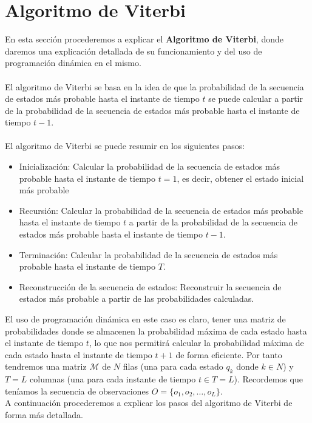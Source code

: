 \documentclass[11pt,openany]{book}
\begin{document}
\section{Algoritmo de Viterbi}
En esta sección procederemos a explicar el \textbf{Algoritmo de Viterbi}, donde daremos una explicación detallada de su funcionamiento y del uso de programación dinámica en el mismo. \\ \\
El algoritmo de Viterbi se basa en la idea de que la probabilidad de la secuencia de estados más probable hasta el instante de tiempo $t$ se puede calcular a partir de la probabilidad
de la secuencia de estados más probable hasta el instante de tiempo $t-1$. \\ \\
El algoritmo de Viterbi se puede resumir en los siguientes pasos:
\begin{itemize}
      \item Inicialización: Calcular la probabilidad de la secuencia de estados más probable hasta el instante de tiempo $t=1$, es decir, obtener el estado inicial más probable 
      \item Recursión: Calcular la probabilidad de la secuencia de estados más probable hasta el instante de tiempo $t$ a partir de la probabilidad de la secuencia de estados más probable
      hasta el instante de tiempo $t-1$.
      \item Terminación: Calcular la probabilidad de la secuencia de estados más probable hasta el instante de tiempo $T$.
      \item Reconstrucción de la secuencia de estados: Reconstruir la secuencia de estados más probable a partir de las probabilidades calculadas.
\end{itemize}

El uso de programación dinámica en este caso es claro, tener una matriz de probabilidades donde se almacenen la probabilidad máxima de cada estado hasta el instante de tiempo $t$,
lo que nos permitirá calcular la probabilidad máxima de cada estado hasta el instante de tiempo $t+1$ de forma eficiente. Por tanto tendremos una matriz $\mathscr{M}$ de $N$ filas 
(una para cada estado $q_k$ donde $k\in N$) y $T=L$ columnas (una para cada instante de tiempo $t\in T=L$). Recordemos que teníamos la secuencia de observaciones $O=\{o_1, o_2, \ldots, o_L\}$.\\

A continuación procederemos a explicar los pasos del algoritmo de Viterbi de forma más detallada. \\ \\ 
\end{document}
